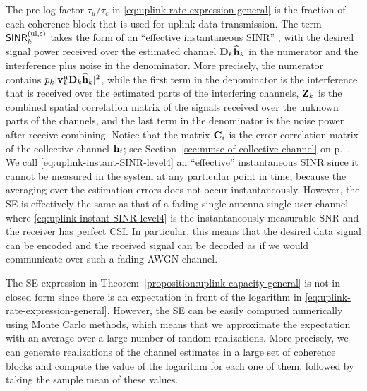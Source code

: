 The pre-log factor ${\tau_u}/{\tau_c}$ in \eqref{eq:uplink-rate-expression-general} is the fraction of each coherence block that is used for uplink data transmission. The term $\mathsf{SINR}_{k}^{({\rm ul},\mathsf{c})}$ takes the form of an ``effective instantaneous SINR'' \cite{massivemimobook}, with the desired signal power received over the estimated channel $\mathbf{D}_k{\widehat{\mathbf{h}}}_k$ in the numerator and the interference plus noise in the denominator. More precisely, the numerator contains $p_{k}|  \vect{v}_{k}^{\Htran} \vect{D}_{k}\widehat{\vect{h}}_{k} |^2$, while the first term in the denominator is the interference that is received over the estimated parts of the interfering channels, ${\bf{Z}}_k $ is the combined spatial correlation matrix of the signals received over the unknown parts of the channels, and the last term in the denominator is the noise power after receive combining. Notice that the matrix $\mathbf{C}_{i}$ is the error correlation matrix of the collective channel ${\mathbf{h}}_{i}$; see Section~\ref{sec:mmse-of-collective-channel} on p.~\pageref{sec:mmse-of-collective-channel}.
We call \eqref{eq:uplink-instant-SINR-level4}  an ``effective'' instantaneous SINR since it cannot be measured in the system at any particular point in time, because the averaging over the estimation errors does not occur instantaneously.
However, the SE is effectively the same as that of a fading single-antenna single-user channel where \eqref{eq:uplink-instant-SINR-level4} is the instantaneously measurable SNR and the receiver has perfect CSI. In particular, this means that the desired data signal can be encoded and the received signal can be decoded as if we would communicate over such a fading \gls{AWGN} channel.

The SE expression in Theorem~\ref{proposition:uplink-capacity-general} is not in closed form since there is an expectation in front of the logarithm in \eqref{eq:uplink-rate-expression-general}. However, the SE can be easily computed numerically using Monte Carlo methods, which means that we approximate the expectation with an average over a large number of random realizations. More precisely, we can generate realizations of the channel estimates in a large set of coherence blocks and compute the value of the logarithm for each one of them, followed by taking the sample mean of these values.

\enlargethispage{\baselineskip} 

